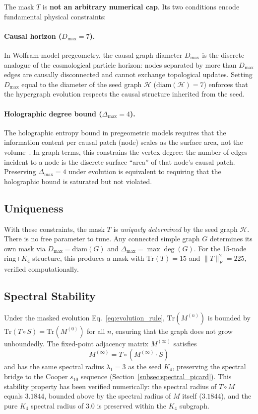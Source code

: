 The mask $T$ is \textbf{not an arbitrary numerical cap}.  Its two conditions encode fundamental physical constraints:

\paragraph{Causal horizon ($D_{\max} = 7$).}
In Wolfram-model pregeometry, the causal graph diameter $D_{\max}$ is the discrete analogue of the cosmological particle horizon: nodes separated by more than $D_{\max}$ edges are causally disconnected and cannot exchange topological updates.  Setting $D_{\max}$ equal to the diameter of the seed graph $\mathcal{H}$ ($\mathrm{diam}(\mathcal{H}) = 7$) enforces that the hypergraph evolution respects the causal structure inherited from the seed.

\paragraph{Holographic degree bound ($\Delta_{\max} = 4$).}
The holographic entropy bound in pregeometric models requires that the information content per causal patch (node) scales as the surface area, not the volume~\cite{Bousso2002}.  In graph terms, this constrains the vertex degree: the number of edges incident to a node is the discrete surface ``area'' of that node's causal patch.  Preserving $\Delta_{\max} = 4$ under evolution is equivalent to requiring that the holographic bound is saturated but not violated.

\subsection{Uniqueness}

With these constraints, the mask $T$ is \emph{uniquely determined} by the seed graph $\mathcal{H}$.  There is no free parameter to tune.  Any connected simple graph $G$ determines its own mask via $D_{\max} = \mathrm{diam}(G)$ and $\Delta_{\max} = \max\deg(G)$.  For the 15-node ring+$K_4$ structure, this produces a mask with $\mathrm{Tr}(T) = 15$ and $\|T\|_F^2 = 225$, verified computationally.

\subsection{Spectral Stability}

Under the masked evolution Eq.~\eqref{eq:evolution_rule}, $\mathrm{Tr}(M^{(n)})$ is bounded by $\mathrm{Tr}(T \circ S) = \mathrm{Tr}(M^{(0)})$ for all $n$, ensuring that the graph does not grow unboundedly.  The fixed-point adjacency matrix $M^{(\infty)}$ satisfies
\begin{equation}
    M^{(\infty)} = T \circ (M^{(\infty)} \cdot S)
\end{equation}
and has the same spectral radius $\lambda_1 = 3$ as the seed $K_4$, preserving the spectral bridge to the Cooper $s_{10}$ sequence (Section~\ref{subsec:spectral_picard}).  This stability property has been verified numerically: the spectral radius of $T \circ M$ equals $3.1844$, bounded above by the spectral radius of $M$ itself ($3.1844$), and the pure $K_4$ spectral radius of $3.0$ is preserved within the $K_4$ subgraph.
